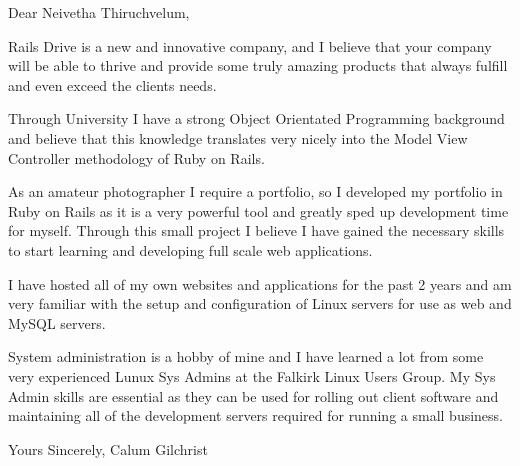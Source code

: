 Dear Neivetha Thiruchvelum,

Rails Drive is a new and innovative company, and I believe that your company will be able
to thrive and provide some truly amazing products that always fulfill and even exceed
the clients needs.

Through University I have a strong Object Orientated Programming background and
believe that this knowledge translates very nicely into the Model View
Controller methodology of Ruby on Rails.

As an amateur photographer I require a portfolio, so I developed my portfolio in
Ruby on Rails as it is a very powerful tool and greatly sped up development time
for myself. Through this small project I believe I have gained the necessary
skills to start learning and developing full scale web applications.

I have hosted all of my own websites and applications for the past 2 years and
am very familiar with the setup and configuration of Linux servers for use as
web and MySQL servers.

System administration is a hobby of mine and I have learned a lot from some very
experienced Lunux Sys Admins at the Falkirk Linux Users Group. My Sys Admin
skills are essential as they can be used for rolling out client software and
maintaining all of the development servers required for running a small
business.

Yours Sincerely,
Calum Gilchrist
